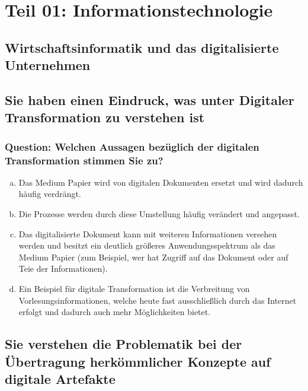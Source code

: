 \documentclass{article}
\begin{document}
	\pagestyle{fancy}
	
	\section*{Teil 01: Informationstechnologie}
	\begin{adjustwidth}{2em}{2em}
		\section{Wirtschaftsinformatik und das digitalisierte Unternehmen}
		\begin{adjustwidth}{2em}{2em}
			\subsection{Sie haben einen Eindruck, was unter Digitaler Transformation zu verstehen ist}
			\begin{adjustwidth}{1em}{}
				\subsubsection*{Question: Welchen Aussagen bezüglich der digitalen Transformation stimmen Sie zu?}
				\begin{adjustwidth}{1em}{}
					\begin{enumerate}[(a)]
						\item Das Medium Papier wird von digitalen Dokumenten ersetzt und wird dadurch häufig verdrängt.
						\item Die Prozesse werden durch diese Umstellung häufig verändert und angepasst.
						\item Das digitalisierte Dokument kann mit weiteren Informationen versehen werden und besitzt ein deutlich größeres Anwendungsspektrum als das Medium Papier (zum Beispiel, wer hat Zugriff auf das Dokument oder auf Teie der Informationen).
						\item Ein Beispiel für digitale Transformation ist die Verbreitung von Vorlesungsinformationen, welche heute fast ausschließlich durch das Internet erfolgt und dadurch auch mehr Möglichkeiten bietet.
					\end{enumerate}
				\end{adjustwidth}
			\end{adjustwidth}
			\subsection{Sie verstehen die Problematik bei der Übertragung herkömmlicher Konzepte auf digitale Artefakte}
			\begin{adjustwidth}{1em}{}

\end{adjustwidth}
\end{adjustwidth}
\end{adjustwidth}
\end{document}
